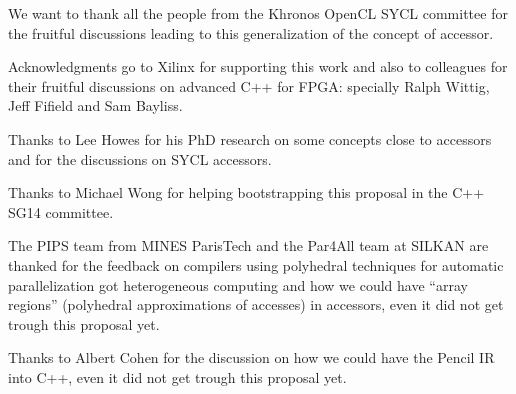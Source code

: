 \documentclass[a4paper]{article}
\begin{document}
We want to thank all the people from the Khronos OpenCL SYCL committee
for the fruitful discussions leading to this generalization of the
concept of accessor.

Acknowledgments go to Xilinx for supporting this work and also to
colleagues for their fruitful discussions on advanced C++ for FPGA:
specially Ralph Wittig, Jeff Fifield and Sam Bayliss.

Thanks to Lee Howes for his PhD \cite{PhD:Howes2010} research on some
concepts close to accessors and for the discussions on SYCL accessors.

Thanks to Michael Wong for helping bootstrapping this proposal in the
C++ SG14 committee.

The PIPS team from MINES ParisTech and the Par4All team at SILKAN are
thanked for the feedback on compilers using polyhedral techniques for
automatic parallelization got heterogeneous computing and how we could
have ``array regions'' (polyhedral approximations of accesses) in
accessors, even it did not get trough this proposal yet.

Thanks to Albert Cohen for the discussion on how we could have the
Pencil IR into C++, even it did not get trough this proposal yet.




\end{document}
